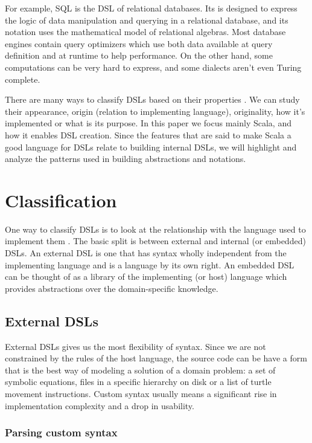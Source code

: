 For example, SQL is the DSL of relational databases. Its is designed to express the logic of data manipulation and querying in a relational database, and its notation uses the mathematical model of relational algebras. Most database engines contain query optimizers which use both data available at query definition and at runtime to help performance. On the other hand, some computations can be very hard to express, and some dialects aren't even Turing complete.

There are many ways to classify DSLs based on their properties \autocite{Gunther:2011}. We can study their appearance, origin (relation to implementing language), originality, how it's implemented or what is its purpose. In this paper we focus mainly Scala, and how it enables DSL creation. Since the features that are said to make Scala a good language for DSLs relate to building internal DSLs, we will highlight and analyze the patterns used in building abstractions and notations.

\section{Classification}
One way to classify DSLs is to look at the relationship with the language used to implement them \autocite{Artho:2015, Gunther:2011}. The basic split is between external and internal (or embedded) DSLs. An external DSL is one that has syntax wholly independent from the implementing language and is a language by its own right. An embedded DSL can be thought of as a library of the implementing (or host) language which provides abstractions over the domain-specific knowledge.

\subsection{External DSLs}

External DSLs gives us the most flexibility of syntax. Since we are not constrained by the rules of the host language, the source code can be have a form that is the best way of modeling a solution of a domain problem: a set of symbolic equations, files in a specific hierarchy on disk or a list of turtle movement instructions. Custom syntax usually means a significant rise in implementation complexity and a drop in usability.

\subsubsection{Parsing custom syntax}

